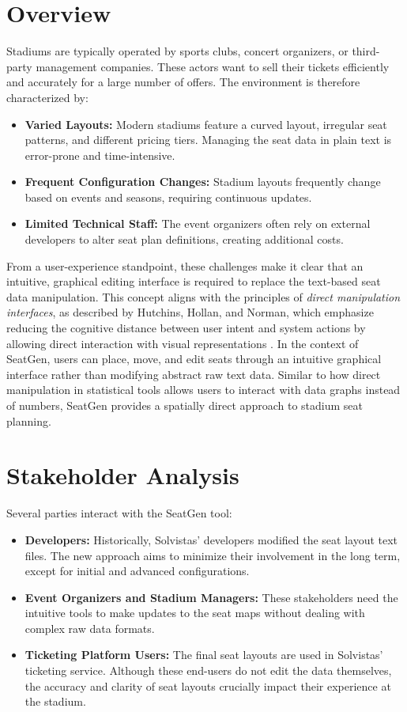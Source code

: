 \section{Overview}
Stadiums are typically operated by sports clubs, concert organizers, or third-party management companies. These actors want to sell their tickets efficiently and accurately for a large number of offers. The environment is therefore characterized by:
\begin{itemize}
    \item \textbf{Varied Layouts:} Modern stadiums feature a curved layout, irregular seat patterns, and different pricing tiers. Managing the seat data in plain text is error-prone and time-intensive.
    \item \textbf{Frequent Configuration Changes:} Stadium layouts frequently change based on events and seasons, requiring continuous updates.
    \item \textbf{Limited Technical Staff:} The event organizers often rely on external developers to alter seat plan definitions, creating additional costs.
\end{itemize}

From a user-experience standpoint, these challenges make it clear that an intuitive, graphical editing interface is required to replace the text-based seat data manipulation. This concept aligns with the principles of \emph{direct manipulation interfaces}, as described by Hutchins, Hollan, and Norman, which emphasize reducing the cognitive distance between user intent and system actions by allowing direct interaction with visual representations \cite{Hutchins01121985}. In the context of SeatGen, users can place, move, and edit seats through an intuitive graphical interface rather than modifying abstract raw text data. Similar to how direct manipulation in statistical tools allows users to interact with data graphs instead of numbers, SeatGen provides a spatially direct approach to stadium seat planning.

\newpage
\section{Stakeholder Analysis}
Several parties interact with the SeatGen tool:
\begin{itemize}
    \item \textbf{Developers:} Historically, Solvistas' developers modified the seat layout text files. The new approach aims to minimize their involvement in the long term, except for initial and advanced configurations.
    \item \textbf{Event Organizers and Stadium Managers:} These stakeholders need the intuitive tools to make updates to the seat maps without dealing with complex raw data formats.
    \item \textbf{Ticketing Platform Users:} The final seat layouts are used in Solvistas' ticketing service. Although these end-users do not edit the data themselves, the accuracy and clarity of seat layouts crucially impact their experience at the stadium.
\end{itemize}

